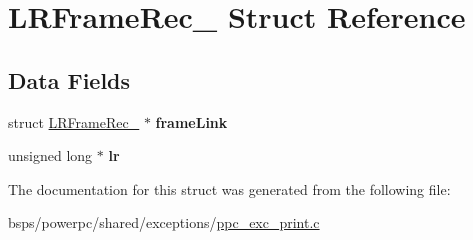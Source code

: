 \hypertarget{structLRFrameRec__}{}\section{L\+R\+Frame\+Rec\+\_\+ Struct Reference}
\label{structLRFrameRec__}
\subsection*{Data Fields}
\begin{DoxyCompactItemize}
\item 
\mbox{\label{structLRFrameRec___a519d5ccfc2f22867c83db475563c2fc3}} 
struct \mbox{\hyperlink{structLRFrameRec__}{L\+R\+Frame\+Rec\+\_\+}} $\ast$ {\bfseries frame\+Link}
\item 
\mbox{\label{structLRFrameRec___ad0e80d6f7e112767b2c31e7f0fee6f95}} 
unsigned long $\ast$ {\bfseries lr}
\end{DoxyCompactItemize}


The documentation for this struct was generated from the following file\+:\begin{DoxyCompactItemize}
\item 
bsps/powerpc/shared/exceptions/\mbox{\hyperlink{ppc__exc__print_8c}{ppc\+\_\+exc\+\_\+print.\+c}}\end{DoxyCompactItemize}
